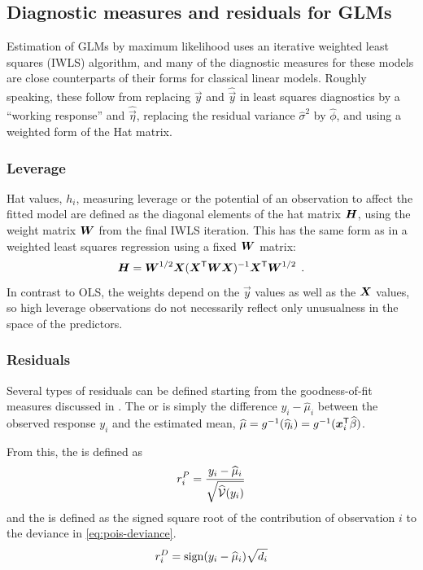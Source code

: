 \documentclass[11pt]{book}\usepackage[]{graphicx}\usepackage[]{color}
\begin{document}
\subsection{Diagnostic measures and residuals for GLMs}

Estimation of GLMs by maximum likelihood uses an iterative weighted least squares (IWLS) algorithm, 
and many of the diagnostic measures for these models are close counterparts of their forms for 
classical linear models.  Roughly speaking, these follow from replacing 
$\vec{y}$ and $\widehat{\vec{y}}$ in least squares diagnostics by a ``working response'' and
$\widehat{\vec{\eta}}$, replacing the residual variance $\widehat{\sigma}^2$ by $\widehat{\phi}$,
and using a weighted form of the Hat matrix.

\subsubsection{Leverage}
Hat values, $h_i$, measuring leverage or the potential of an observation to affect the fitted model
are defined as the diagonal elements of the hat matrix $\bm{H}$, using the weight matrix
$\bm{W}$ from the final IWLS iteration.  This has the same form as in a weighted least squares
regression using a fixed $\bm{W}$ matrix:
\begin{equation*}
\bm{H} = \bm{W}^{1/2} \bm{X} (\bm{X}^\mathsf{T} \bm{W}  \bm{X} )^{-1} \bm{X}^\mathsf{T} \bm{W}^{1/2} \:\: .
\end{equation*}
In contrast to OLS, the weights depend on the $\vec{y}$ values as well as the $\bm{X}$ values, so
high leverage observations do not necessarily reflect only unusualness in the space of the
predictors.

\subsubsection{Residuals}

Several types of residuals can be defined starting from the goodness-of-fit measures
discussed in .
The  or  is simply the difference $y_i - \widehat{\mu}_i$
between the observed response $y_i$ and the estimated mean, 
$\widehat{\mu} = g^{-1} (\widehat{\eta}_i) = g^{-1} (\bm{x}_i^\mathsf{T} \widehat{\beta})$.

From this, the  is defined as
\begin{equation}\label{eq:res-pearson}
r^P_i = \frac{y_i - \widehat{\mu}_i} {\sqrt{\widehat{\mathcal{V}}(y_i)}}
\end{equation}
and the  is defined as the signed square root of the contribution of observation $i$ to the
deviance in \eqref{eq:pois-deviance}.
\begin{equation}\label{eq:res-deviance}
r^D_i = \sign (y_i - \widehat{\mu}_i) \sqrt {d_i}
\end{equation}
\end{document}
